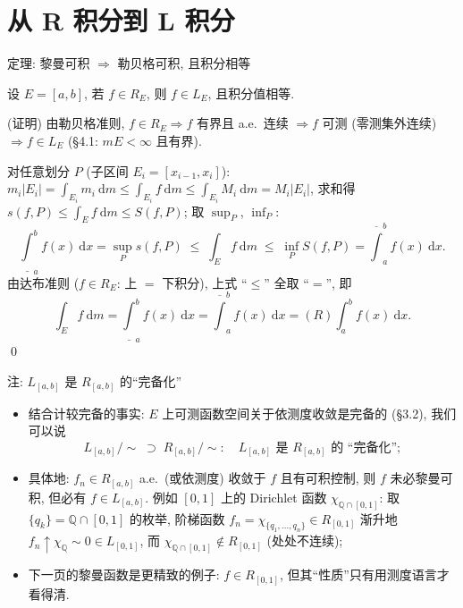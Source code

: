 
\section[R$\subset$L]{从 R 积分到 L 积分}


\begin{frame}{定理: 黎曼可积 $\Longrightarrow$ 勒贝格可积, 且积分相等}

\begin{thm}
设 $E = [a, b]$, 若 $f \in R_E$, 则 $f \in L_E$, 且积分值相等.
\end{thm}

\startproof[bg=yellow, fg=red](证明)
由勒贝格准则, $f \in R_E \Rightarrow f$ 有界且 a.e.\ 连续
$\Rightarrow f$ 可测 (零测集外连续) $\Rightarrow f \in L_E$ (\S 4.1: $mE < \infty$ 且有界).

对任意划分 $P$ (子区间 $E_i = [x_{i-1}, x_i]$):
$m_i |E_i| = \int_{E_i} m_i ~ \mathrm{d} m \leqslant \int_{E_i} f ~ \mathrm{d} m \leqslant \int_{E_i} M_i ~ \mathrm{d} m = M_i |E_i|$,
求和得 $s(f, P) \leqslant \int_E f ~ \mathrm{d} m \leqslant S(f, P)$; 取 $\sup_P$, $\inf_P$:
\[
\underline{\int}_a^b f(x) ~ \mathrm{d} x = \sup_P s(f, P)
\;\leqslant\; \int_E f ~ \mathrm{d} m
\;\leqslant\; \inf_P S(f, P) = \overline{\int}_a^b f(x) ~ \mathrm{d} x .
\]
由达布准则 ($f \in R_E$: 上 $=$ 下积分), 上式 ``$\leqslant$'' 全取 ``$=$'', 即
\[
\int_E f ~ \mathrm{d} m
= \underline{\int}_a^b f(x) ~ \mathrm{d} x
= \overline{\int}_a^b f(x) ~ \mathrm{d} x
= (R) \int_a^b f(x) ~ \mathrm{d} x .
\]
\qed

\end{frame}


\begin{frame}{注: $L_{[a,b]}$ 是 $R_{[a,b]}$ 的``完备化''}

\begin{itemize}
\item 结合计较完备的事实: $E$ 上可测函数空间关于\alert{依测度收敛}是完备的 (\S 3.2), 我们可以说
  \[
  L_{[a,b]} \big/ \sim
  \;\supset\;
  R_{[a,b]} \big/ \sim :
  \quad
  L_{[a,b]} \text{ 是 } R_{[a,b]} \text{ 的 ``完备化''} ;
  \]
\graymode
\item 具体地: $f_n \in R_{[a,b]}$ a.e.\ (或依测度) 收敛于 $f$ 且有可积控制, 则 $f$ 未必黎曼可积,
  但必有 $f \in L_{[a,b]}$. 例如 $[0,1]$ 上的 Dirichlet 函数
  $\chi_{\mathbb{Q} \cap [0,1]}$: 取 $\{q_k\} = \mathbb{Q} \cap [0, 1]$ 的枚举,
  阶梯函数 $f_n = \chi_{\{q_1, \dots, q_n\}} \in R_{[0,1]}$ 渐升地
  $f_n \uparrow \chi_{\mathbb{Q}} \sim 0 \in L_{[0,1]}$,
  而 $\chi_{\mathbb{Q} \cap [0,1]} \notin R_{[0,1]}$ (处处不连续);
\normalmode
\item 下一页的黎曼函数是更精致的例子: $f \in R_{[0,1]}$, 但其``性质''只有用测度语言才看得清.
\end{itemize}

\end{frame}

